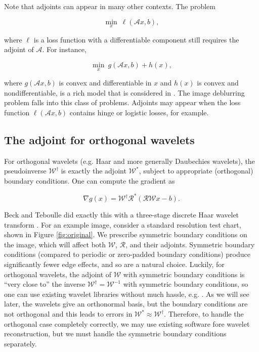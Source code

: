 \documentclass[journal]{IEEEtran}
\begin{document}

Note that adjoints can appear in many other contexts.  The problem

\[ \min_x~ \ell(\mathcal{A}x,b), \] 

\noindent where $\ell$ is a loss function with a differentiable component still requires the adjoint of $\mathcal{A}$.  For instance,

\[ \min_x~ g(\mathcal{A}x,b) + h(x), \] 

\noindent where $g(\mathcal{A}x,b)$ is convex and differentiable in $x$ and $h(x)$ is convex and nondifferentiable, is a rich model that is considered in \cite{beck_2009b}.  The image deblurring problem falls into this class of problems.  Adjoints may appear when the loss function $\ell(\mathcal{A}x,b)$ contains hinge or logistic losses, for example.\\

\subsection{The adjoint for orthogonal wavelets}
For orthogonal wavelets (e.g. Haar and more generally Daubechies wavelets), the pseudoinverse $\mathcal{W}^\dagger$ is exactly the adjoint $\mathcal{W}^\ast$, subject to appropriate (orthogonal) boundary conditions.  One can compute the gradient as

\[ \nabla g(x) = \mathcal{W}^\dagger \mathcal{R}^\ast \left(\mathcal{RW}x-b\right). \] 

\noindent Beck and Teboulle did exactly this with a three-stage discrete Haar wavelet transform \cite{beck_2009}.  For an example image, consider a standard resolution test chart, shown in Figure \ref{fig:original}.  We prescribe symmetric boundary conditions on the image, which will affect both $\mathcal{W}$, $\mathcal{R}$, and their adjoints.  Symmetric boundary conditions (compared to periodic or zero-padded boundary conditions) produce significantly fewer edge effects, and so are a natural choice.  Luckily, for orthogonal wavelets, the adjoint of $\mathcal{W}$ with symmetric boundary conditions is ``very close to'' the inverse $\mathcal{W}^\dagger=\mathcal{W}^{-1}$ with symmetric boundary conditions, so one can use existing wavelet libraries without much hassle, e.g. \cite{matlab_wt_2015}.  As we will see later, the wavelets give an orthonormal basis, but the boundary conditions are not orthogonal and this leads to errors in $\mathcal{W}^\ast\approx\mathcal{W}^\dagger$.  Therefore, to handle the orthogonal case completely correctly, we may use existing software fore wavelet reconstruction, but we must handle the symmetric boundary conditions separately.\\
\end{document}
